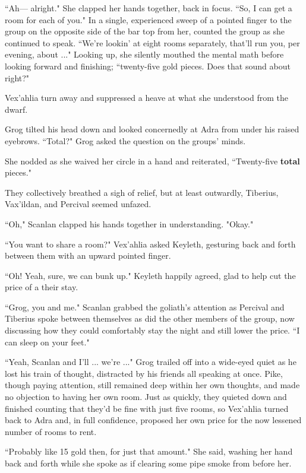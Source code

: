 ``Ah--- alright." She clapped her hands together, back in focus. ``So, I can get a room for each of you." In a single, experienced sweep of a pointed finger to the group on the opposite side of the bar top from her, counted the group as she continued to speak. ``We're lookin' at eight rooms separately, that'll run you, per evening, about ..." Looking up, she silently mouthed the mental math before looking forward and finishing; ``twenty-five gold pieces. Does that sound about right?"

Vex'ahlia turn away and suppressed a heave at what she understood from the dwarf.

Grog tilted his head down and looked concernedly at Adra from under his raised eyebrows. ``Total?" Grog asked the question on the groups' minds.

She nodded as she waived her circle in a hand and reiterated, ``Twenty-five \textbf{total} pieces." 

They collectively breathed a sigh of relief, but at least outwardly, Tiberius, Vax'ildan, and Percival seemed unfazed.

``Oh," Scanlan clapped his hands together in understanding. "Okay."

``You want to share a room?" Vex'ahlia asked Keyleth, gesturing back and forth between them with an upward pointed finger.

``Oh! Yeah, sure, we can bunk up." Keyleth happily agreed, glad to help cut the price of a their stay.

``Grog, you and me." Scanlan grabbed the goliath's attention as Percival and Tiberius spoke between themselves as did the other members of the group, now discussing how they could comfortably stay the night and still lower the price. ``I can sleep on your feet."

``Yeah, Scanlan and I'll ... we're ..." Grog trailed off into a wide-eyed quiet as he lost his train of thought, distracted by his friends all speaking at once. Pike, though paying attention, still remained deep within her own thoughts, and made no objection to having her own room. Just as quickly, they quieted down and finished counting that they'd be fine with just five rooms, so Vex'ahlia turned back to Adra and, in full confidence, proposed her own price for the now lessened number of rooms to rent.

``Probably like 15 gold then, for just that amount." She said, washing her hand back and forth while she spoke as if clearing some pipe smoke from before her.

